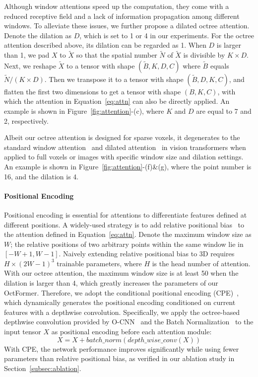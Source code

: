 \documentclass[acmtog,screen,authorversion]{acmart}
\begin{document}
Although window attentions speed up the computation, they come with a reduced receptive field and a lack of information propagation among different windows.
To alleviate these issues, we further propose a dilated octree attention.
Denote the dilation as $D$, which is set to 1 or 4 in our experiments.
For the octree attention described above, its dilation can be regarded as 1.
When $D$ is larger than 1, we pad $X$ to $\tilde{X}$ so that the spatial number $\tilde{N}$ of $\tilde{X}$ is divisible by $K \times D$.
Next, we reshape $\tilde{X}$ to a tensor with shape $(\tilde{B}, K, D, C)$ where $\tilde{B}$ equals $ \tilde{N} / (K \times D)$.
Then we transpose it to a tensor with shape $(\tilde{B}, D, K, C)$, and flatten the first two dimensions to get a tensor with shape $(B, K, C)$, with which the attention in Equation~\ref{eq:attn} can also be directly applied.
An example is shown in Figure~\ref{fig:attention}-(c), where $K$ and $D$ are equal to 7 and 2, respectively.


Albeit our octree attention is designed for sparse voxels, it degenerates to the standard window attention~\cite{Liu2021a} and dilated attention~\cite{Hassani2022,Liu2022} in vision transformers when applied to full voxels or images with specific window size and dilation settings.
An example is shown in Figure~\ref{fig:attention}-(f)\&(g), where the point number is 16, and the dilation is 4.


\paragraph{Positional Encoding}
Positional encoding is essential for attentions to differentiate features defined at different positions.
A widely-used strategy is to add relative positional bias~\cite{Raffel2020,Liu2021a} to the attention defined in Equation~\ref{eq:attn}.
Denote the maximum window size as $W$; the relative positions of two arbitrary points within the same window lie in $[-W+1, W-1]$.
Naively extending relative positional bias to 3D requires $H \times (2W-1)^3$ trainable parameters, where $H$ is the head number of attention.
With our octree attention, the maximum window size is at least 50 when the dilation is larger than 4, which greatly increases the parameters of our OctFormer.
Therefore, we adopt the conditional positional encoding (CPE)~\cite{Chu2021,Dong2022,Wang2022a}, which dynamically generates the positional encoding conditioned on current features with a depthwise convolution.
Specifically, we apply the octree-based depthwise convolution provided by O-CNN~\cite{Wang2017} and the Batch Normalization~\cite{Loffe2015} to the input tensor $X$ as positional encoding before each attention module:
\begin{equation}
  X = X + batch\_norm(depth\_wise\_conv(X))
\end{equation}
With CPE, the network performance improves significantly while using fewer parameters than relative positional bias, as verified in our ablation study in Section~\ref{subsec:ablation}.
\end{document}
